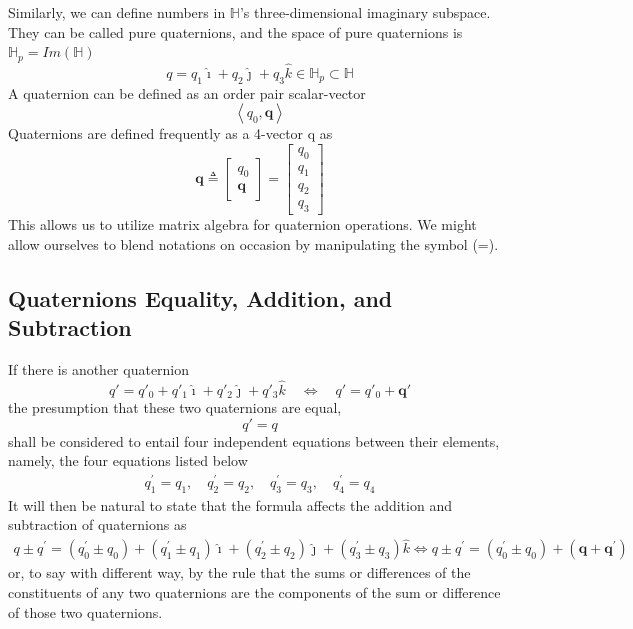 Similarly, we can define numbers in $\mathbb{H}$'s three-dimensional imaginary subspace. They can be called pure quaternions, and the space of pure quaternions is $\mathbb{H}_p=Im(\mathbb{H})$ 
\begin{equation}
    q=q_{1} \hat{\imath}+q_{2} \hat{\jmath}+q_{3} \hat{k} \in \mathbb{H}_p \subset \mathbb{H} 
\end{equation}
A quaternion can be defined as an order pair scalar-vector
\begin{equation}
\left\langle q_{0}, \boldsymbol{q}\right\rangle
\end{equation}
Quaternions are defined frequently as a 4-vector q as
\begin{equation}
\boldsymbol{q} \triangleq\left[\begin{array}{c}
q_{0} \\
\boldsymbol{q}
\end{array}\right]=\left[\begin{array}{l}
q_{0} \\
q_{1} \\
q_{2} \\
q_{3}
\end{array}\right]
\end{equation}
This allows us to utilize matrix algebra for quaternion operations. We might allow ourselves to blend notations on occasion by manipulating the symbol (=).
\subsection{Quaternions Equality, Addition, and Subtraction}
If there is another quaternion
\begin{equation}
    q'=q'_{0}+q'_{1} \hat{\imath}+q'_{2} \hat{\jmath}+q'_{3} \hat{k} \quad \Leftrightarrow \quad q'=q'_{0}+\boldsymbol{q'}
\end{equation}
the presumption that these two quaternions are equal,
\begin{equation}
    q'=q
\end{equation}
shall be considered to entail four independent equations between their elements, namely, the four equations listed below
\begin{equation}
\begin{gathered}
q_{1}^{\prime}=q_{1}, \quad q_{2}^{\prime}=q_{2}, \quad q_{3}^{\prime}=q_{3}, \quad q_{4}^{\prime}=q_{4}
\end{gathered}
\end{equation}
It will then be natural to state that the formula affects the addition and subtraction of quaternions as
\begin{equation}
\begin{gathered}
q \pm q^{\prime}=\left(q_{0}^{\prime} \pm q_{0}\right)+\left(q_{1}^{\prime} \pm q_{1}\right) \hat{\imath}+\left(q_{2}^{\prime} \pm q_{2}\right) \hat{\jmath}+\left(q_{3}^{\prime} \pm q_{3}\right) \hat{k} \Leftrightarrow q \pm q^{\prime}=\left(q_{0}^{\prime} \pm q_{0}\right)+\left(\boldsymbol{q}+\boldsymbol{q}^{\prime}\right)
\end{gathered}
\end{equation}
or, to say with different way, by the rule that the sums or differences of the constituents of any two quaternions are the components of the sum or difference of those two quaternions.
